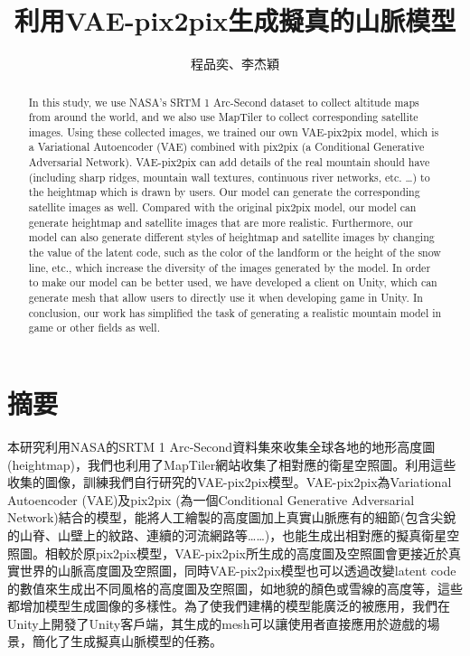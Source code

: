 \documentclass[a4paper, 12pt]{article}
\title{利用VAE-pix2pix生成擬真的山脈模型}
\author{程品奕、李杰穎}
\begin{document}
\tableofcontents
\newpage

\begin{abstract}
    In this study, we use NASA's SRTM 1 Arc-Second dataset to collect altitude maps from around the world, and we also use MapTiler to collect corresponding satellite images. Using these collected images, we trained our own VAE-pix2pix model, which is a Variational Autoencoder (VAE) combined with pix2pix (a Conditional Generative Adversarial Network). VAE-pix2pix can add details of the real mountain should have (including sharp ridges, mountain wall textures, continuous river networks, etc. …) to the heightmap which is drawn by users. Our model can generate the corresponding satellite images as well. Compared with the original pix2pix model, our model can generate heightmap and satellite images that are more realistic. Furthermore, our model can also generate different styles of heightmap and satellite images by changing the value of the latent code, such as the color of the landform or the height of the snow line, etc., which increase the diversity of the images generated by the model. In order to make our model can be better used, we have developed a client on Unity, which can generate mesh that allow users to directly use it when developing game in Unity. In conclusion, our work has simplified the task of generating a realistic mountain model in game or other fields as well.
\end{abstract}
\section*{摘要}
本研究利用NASA的SRTM 1 Arc-Second資料集來收集全球各地的地形高度圖(heightmap)，我們也利用了MapTiler網站收集了相對應的衛星空照圖。利用這些收集的圖像，訓練我們自行研究的VAE-pix2pix模型。VAE-pix2pix為Variational Autoencoder (VAE)及pix2pix (為一個Conditional Generative Adversarial Network)結合的模型，能將人工繪製的高度圖加上真實山脈應有的細節(包含尖銳的山脊、山壁上的紋路、連續的河流網路等……)，也能生成出相對應的擬真衛星空照圖。相較於原pix2pix模型，VAE-pix2pix所生成的高度圖及空照圖會更接近於真實世界的山脈高度圖及空照圖，同時VAE-pix2pix模型也可以透過改變latent code的數值來生成出不同風格的高度圖及空照圖，如地貌的顏色或雪線的高度等，這些都增加模型生成圖像的多樣性。為了使我們建構的模型能廣泛的被應用，我們在Unity上開發了Unity客戶端，其生成的mesh可以讓使用者直接應用於遊戲的場景，簡化了生成擬真山脈模型的任務。
\newpage
{}
\end{document}
